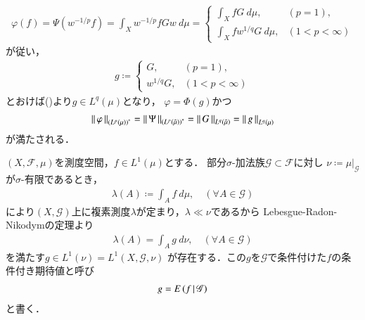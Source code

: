 \begin{prf}
\begin{description}
				\begin{align}
					\varphi(f) = \Psi\left( w^{-1/p} f \right)
					= \int_X w^{-1/p} f G w\ d\mu
					= \begin{cases}
						\displaystyle\int_X f G\ d\mu, & (p = 1), \\
						\displaystyle\int_X f w^{1/q} G\ d\mu, & (1 < p < \infty)
					\end{cases}
				\end{align}
				が従い，
				\begin{align}
					g \coloneqq
					\begin{cases}
						G, & (p = 1), \\
						w^{1/q} G, & (1 < p < \infty)
					\end{cases}
				\end{align}
				とおけば()より$g \in L^q(\mu)$となり，
				$\varphi = \Phi(g)$かつ
				\begin{align}
					\left\|\, \varphi\, \right\|_{\left( L^p(\mu) \right)^*} = \left\|\, \Psi\, \right\|_{\left( L^p(\tilde{\mu}) \right)^*}
					= \left\|\, G\, \right\|_{L^q(\tilde{\mu})}
					= \left\|\, g\, \right\|_{L^q(\mu)}
				\end{align}
				が満たされる．
				\QED
		\end{description}
	\end{prf}
	
	\begin{screen}
		\begin{dfn}[条件付き期待値]
			$(X,\mathscr{F},\mu)$を測度空間，$f \in L^1(\mu)$とする．
			部分$\sigma$-加法族$\mathscr{G} \subset \mathscr{F}$に対し
			$\nu \coloneqq \left. \mu \right|_{\mathscr{G}}$が$\sigma$-有限であるとき，
			\begin{align}
				\lambda(A) \coloneqq \int_A f\ d\mu,
				\quad (\forall A \in \mathscr{G})
			\end{align}
			により$(X,\mathscr{G})$上に複素測度$\lambda$が定まり，$\lambda \ll \nu$であるから
			Lebesgue-Radon-Nikodymの定理より
			\begin{align}
				\lambda(A) = \int_A g\ d\nu,
				\quad (\forall A \in \mathscr{G})
			\end{align}
			を満たす$g \in L^1(\nu) = L^1\left(X,\mathscr{G},\nu\right)$
			が存在する．この$g$を$\mathscr{G}$で条件付けた$f$の条件付き期待値と呼び
			\begin{align}
				g = E\left( f \, \middle|\, \mathscr{G} \right)
			\end{align}
			と書く．
		\end{dfn}
	\end{screen}
	
